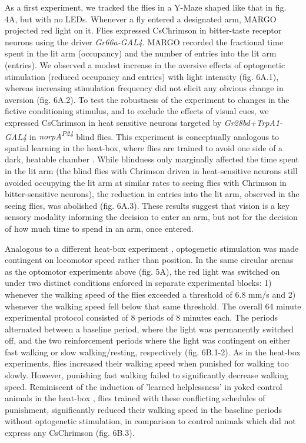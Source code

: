 \documentclass[12pt,letterpaper]{article}
\begin{document}
As a first experiment, we tracked the flies in a Y-Maze shaped like that in fig. 4A, but with no LEDs. Whenever a fly entered a designated arm, MARGO projected red light on it. Flies expressed CsChrimson in bitter-taste receptor neurons using the driver \textit{Gr66a-GAL4}. MARGO recorded the fractional time spent in the lit arm (occupancy) and the number of entries into the lit arm (entries). We observed a modest increase in the aversive effects of optogenetic stimulation (reduced occupancy and entries) with light intensity (fig. 6A.1), whereas increasing stimulation frequency did not elicit any obvious change in aversion (fig. 6A.2). To test the robustness of the experiment to changes in the fictive conditioning stimulus, and to exclude the effects of visual cues, we expressed CsChrimson in heat sensitive neurons targeted by \textit{Gr28bd+TrpA1-GAL4} in \textit{norpA\textsuperscript{P24}} blind flies. This experiment is conceptually analogous to spatial learning in the heat-box, where flies are trained to avoid one side of a dark, heatable chamber \cite{wustmann_rein_wolf_heisenberg_1996,wustmann_heisenberg_1997,diegelmann_2006,ostrowski_kahsai_kramer_knutson_zars_2015,putz_2002,sitaraman_zars_zars_2007,sitaraman_zars_zars_2010,zars_zars_2006}. While blindness only marginally affected the time spent in the lit arm (the blind flies with Chrimson driven in heat-sensitive neurons still avoided occupying the lit arm at similar rates to seeing flies with Chrimson in bitter-sensitive neurons), the reduction in entries into the lit arm, observed in the seeing flies, was abolished (fig. 6A.3). These results suggest that vision is a key sensory modality informing the decision to enter an arm, but not for the decision of how much time to spend in an arm, once entered.

Analogous to a different heat-box experiment \cite{YANG2013799}, optogenetic stimulation was made contingent on locomotor speed rather than position. In the same circular arenas as the optomotor experiments above (fig. 5A), the red light was switched on under two distinct conditions enforced in separate experimental blocks: 1) whenever the walking speed of the flies exceeded a threshold of 6.8 mm/s and 2) whenever the walking speed fell below that same threshold. The overall 64 minute experimental protocol consisted of 8 periods of 8 minutes each. The periods alternated between a baseline period, where the light was permanently switched off, and the two reinforcement periods where the light was contingent on either fast walking or slow walking/resting, respectively (fig. 6B.1-2). As in the heat-box experiments, flies increased their walking speed when punished for walking too slowly. However, punishing fast walking failed to significantly decrease walking speed. Reminiscent of the induction of 'learned helplessness' in yoked control animals in the heat-box \cite{YANG2013799}, flies trained with these conflicting schedules of punishment, significantly reduced their walking speed in the baseline periods without optogenetic stimulation, in comparison to control animals which did not express any CsChrimson (fig. 6B.3).
\end{document}
